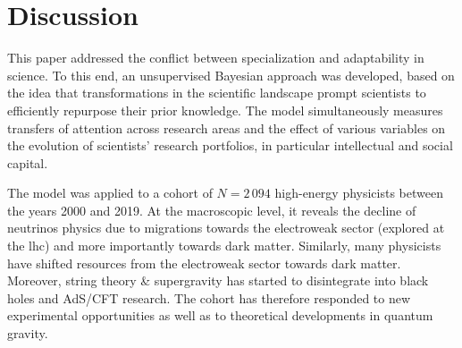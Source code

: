 \documentclass{article}
\begin{document}
\section{Discussion}

This paper addressed the conflict between specialization and adaptability in science. To this end, an unsupervised Bayesian approach was developed, based on the idea that transformations in the scientific landscape prompt scientists to efficiently repurpose their prior knowledge. The model simultaneously measures transfers of attention across research areas and the effect of various variables on the evolution of scientists' research portfolios, in particular intellectual and social capital.






The model was applied to a cohort of $N=2\,094$ high-energy physicists between the years 2000 and 2019. At the macroscopic level, it reveals the decline of neutrinos physics due to migrations towards the electroweak sector (explored at the \gls{lhc}) and more importantly towards dark matter. Similarly, many physicists have shifted resources from the electroweak sector towards dark matter. Moreover, string theory \& supergravity has started to disintegrate into black holes and AdS/CFT research. The cohort has therefore responded to new experimental opportunities as well as to theoretical developments in quantum gravity. 
\end{document}
